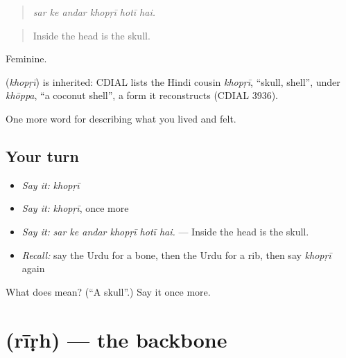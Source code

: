 \begin{quote}
     
\end{quote}

\begin{quote}
\emph{sar ke andar khopṛī hotī hai.}
\end{quote}

\begin{quote}
Inside the head is the skull.
\end{quote}

Feminine.

\begin{cousinweb}
\textbf{} (\emph{khopṛī}) is inherited: CDIAL lists the Hindi cousin \emph{khopṛī}, \textquotedblleft{}skull, shell\textquotedblright{}, under \emph{khōppa}, \textquotedblleft{}a coconut shell\textquotedblright{}, a form it reconstructs (CDIAL 3936).
\end{cousinweb}

\begin{grammarlens}[title={What you've built}]
One more word for describing what you lived and felt.
\end{grammarlens}

\subsection*{Your turn}
\begin{itemize}
\raggedright
  \item \emph{Say it:} \emph{khopṛī}
  \item \emph{Say it:} \emph{khopṛī}, once more
  \item \emph{Say it:} \emph{sar ke andar khopṛī hotī hai.} — Inside the head is the skull.
  \item \emph{Recall:} say the Urdu for a bone, then the Urdu for a rib, then say \emph{khopṛī} again
\end{itemize}

\begin{tcolorbox}[breakable,colback=teal!4,colframe=teal!35!black,title={Before you move on}]
What does  mean? (\textquotedblleft{}A skull\textquotedblright{}.) Say it once more.
\end{tcolorbox}
\section[\texorpdfstring{\ur{ریڑھ} (rīṛh)}{ریڑھ (rīṛh)}]{ (rīṛh) — the backbone}

